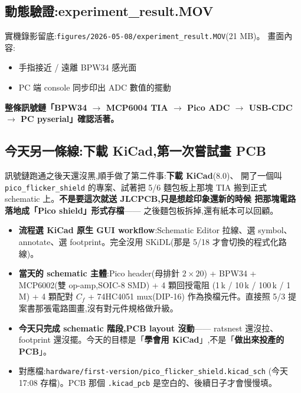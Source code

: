 \subsection*{動態驗證:experiment\_result.MOV}

實機錄影留底:\texttt{figures/2026-05-08/experiment\_result.MOV}(21 MB)。
畫面內容:

\begin{itemize}[leftmargin=2em,itemsep=0pt]
  \item 手指接近 / 遠離 BPW34 感光面
  \item PC 端 console 同步印出 ADC 數值的擺動
\end{itemize}

\textbf{整條訊號鏈「BPW34 \(\to\) MCP6004 TIA \(\to\) Pico ADC \(\to\) USB-CDC \(\to\) PC pyserial」確認活著。}

\subsection*{今天另一條線:下載 KiCad,第一次嘗試畫 PCB}

訊號鏈跑通之後天還沒黑,順手做了第二件事:\textbf{下載 KiCad}(8.0)、
開了一個叫 \texttt{pico\_flicker\_shield} 的專案、試著把 5/6 麵包板上那塊 TIA
搬到正式 schematic 上。\textbf{不是要這次就送 JLCPCB,只是想趁印象還新的時候
把那塊電路落地成「Pico shield」形式存檔}—— 之後麵包板拆掉,還有紙本可以回顧。

\begin{itemize}[leftmargin=2em,itemsep=0pt]
  \item \textbf{流程選 KiCad 原生 GUI workflow}:Schematic Editor 拉線、選 symbol、
        annotate、選 footprint。完全沒用 SKiDL(那是 5/18 才會切換的程式化路線)。
  \item \textbf{當天的 schematic 主體}:Pico header(母排針 \(2 \times 20\)) +
        BPW34 + MCP6002(雙 op-amp,SOIC-8 SMD) + 4 顆回授電阻
        (1\,k / 10\,k / 100\,k / 1\,M) + 4 顆配對 \(C_f\) + 74HC4051 mux(DIP-16)
        作為換檔元件。直接照 5/3 提案書那張電路圖畫,沒有對元件規格做升級。
  \item \textbf{今天只完成 schematic 階段,PCB layout 沒動}—— ratsnest 還沒拉、
        footprint 還沒擺。今天的目標是「\textbf{學會用 KiCad}」,不是「\textbf{做出來投產的 PCB}」。
  \item 對應檔:\texttt{hardware/first-version/pico\_flicker\_shield.kicad\_sch}
        (今天 17:08 存檔)。PCB 那個 \texttt{.kicad\_pcb} 是空白的、後續日子才會慢慢填。
\end{itemize}

